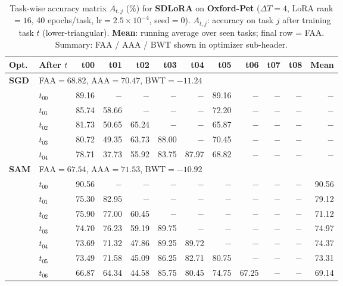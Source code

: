 \begin{table}[ht]
\centering
\caption{%
  Task-wise accuracy matrix $A_{t,j}$ (\%) for \textbf{SDLoRA} on \textbf{Oxford-Pet}
  ($\Delta T=4$, LoRA rank$=16$, 40 epochs/task, lr$=2.5\times10^{-4}$, seed$=0$).
  $A_{t,j}$: accuracy on task $j$ after training task $t$ (lower-triangular).
  \textbf{Mean}: running average over seen tasks; final row = FAA.
  Summary: FAA / AAA / BWT shown in optimizer sub-header.
}
\label{tab:raw_sdlora_oxfordpet}
\setlength{\tabcolsep}{2.8pt}
\renewcommand{\arraystretch}{0.88}
\scriptsize
\begin{tabular}{@{}l l r r r r r r r r r r@{}}
\toprule
\textbf{Opt.} & \textbf{After $t$} & \textbf{t00} & \textbf{t01} & \textbf{t02} & \textbf{t03} & \textbf{t04} & \textbf{t05} & \textbf{t06} & \textbf{t07} & \textbf{t08} & \textbf{Mean} \\
\midrule
\multirow{6}{*}{\textbf{SGD}} & \multicolumn{11}{l}{\quad\small FAA$=68.82$,\; AAA$=70.47$,\; BWT$=-11.24$} \\
 & $t_{00}$ & 89.16 & $-$ & $-$ & $-$ & $-$ & 89.16 & $-$ & $-$ & $-$ & $-$ \\
 & $t_{01}$ & 85.74 & 58.66 & $-$ & $-$ & $-$ & 72.20 & $-$ & $-$ & $-$ & $-$ \\
 & $t_{02}$ & 81.73 & 50.65 & 65.24 & $-$ & $-$ & 65.87 & $-$ & $-$ & $-$ & $-$ \\
 & $t_{03}$ & 80.72 & 49.35 & 63.73 & 88.00 & $-$ & 70.45 & $-$ & $-$ & $-$ & $-$ \\
 & $t_{04}$ & 78.71 & 37.73 & 55.92 & 83.75 & 87.97 & 68.82 & $-$ & $-$ & $-$ & $-$ \\
\midrule
\multirow{10}{*}{\textbf{SAM}} & \multicolumn{11}{l}{\quad\small FAA$=67.54$,\; AAA$=71.53$,\; BWT$=-10.92$} \\
 & $t_{00}$ & 90.56 & $-$ & $-$ & $-$ & $-$ & $-$ & $-$ & $-$ & $-$ & 90.56 \\
 & $t_{01}$ & 75.30 & 82.95 & $-$ & $-$ & $-$ & $-$ & $-$ & $-$ & $-$ & 79.12 \\
 & $t_{02}$ & 75.90 & 77.00 & 60.45 & $-$ & $-$ & $-$ & $-$ & $-$ & $-$ & 71.12 \\
 & $t_{03}$ & 74.70 & 76.23 & 59.19 & 89.75 & $-$ & $-$ & $-$ & $-$ & $-$ & 74.97 \\
 & $t_{04}$ & 73.69 & 71.32 & 47.86 & 89.25 & 89.72 & $-$ & $-$ & $-$ & $-$ & 74.37 \\
 & $t_{05}$ & 73.49 & 71.58 & 45.09 & 86.25 & 82.71 & 80.75 & $-$ & $-$ & $-$ & 73.31 \\
 & $t_{06}$ & 66.87 & 64.34 & 44.58 & 85.75 & 80.45 & 74.75 & 67.25 & $-$ & $-$ & 69.14 \\

\end{tabular}
\end{table}
